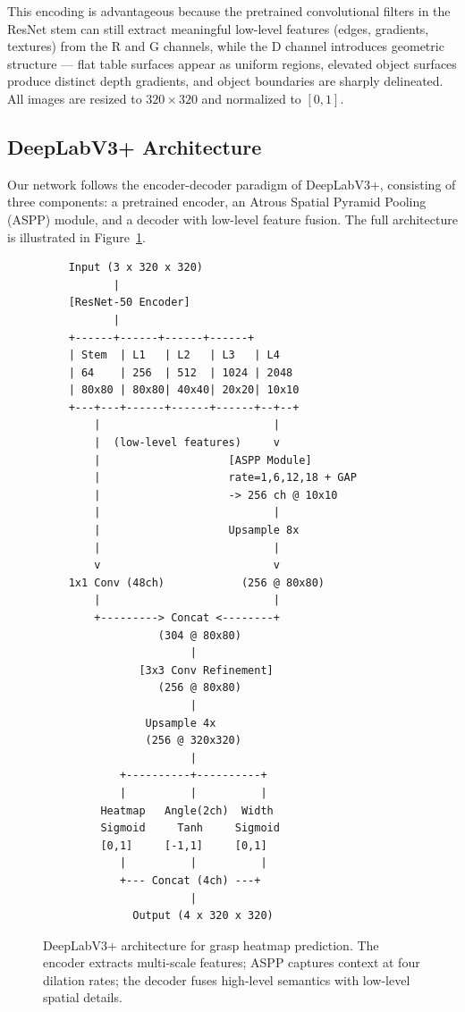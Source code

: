 \documentclass[12pt, a4paper]{article}
\begin{document}
This encoding is advantageous because the pretrained convolutional filters in the ResNet stem can still extract meaningful low-level features (edges, gradients, textures) from the R and G channels, while the D channel introduces geometric structure — flat table surfaces appear as uniform regions, elevated object surfaces produce distinct depth gradients, and object boundaries are sharply delineated. All images are resized to $320 \times 320$ and normalized to $[0, 1]$.

\subsection{DeepLabV3+ Architecture}

Our network follows the encoder-decoder paradigm of DeepLabV3+, consisting of three components: a pretrained encoder, an Atrous Spatial Pyramid Pooling (ASPP) module, and a decoder with low-level feature fusion. The full architecture is illustrated in Figure~\ref{fig:architecture}.

\begin{figure}[H]
\centering
\small
\begin{verbatim}
    Input (3 x 320 x 320)
           |
    [ResNet-50 Encoder]
           |
    +------+------+------+------+
    | Stem  | L1   | L2   | L3   | L4
    | 64    | 256  | 512  | 1024 | 2048
    | 80x80 | 80x80| 40x40| 20x20| 10x10
    +---+---+------+------+------+--+--+
        |                           |
        |  (low-level features)     v
        |                    [ASPP Module]
        |                    rate=1,6,12,18 + GAP
        |                    -> 256 ch @ 10x10
        |                           |
        |                    Upsample 8x
        |                           |
        v                           v
    1x1 Conv (48ch)            (256 @ 80x80)
        |                           |
        +---------> Concat <--------+
                  (304 @ 80x80)
                       |
               [3x3 Conv Refinement]
                  (256 @ 80x80)
                       |
                Upsample 4x
                (256 @ 320x320)
                       |
            +----------+----------+
            |          |          |
         Heatmap   Angle(2ch)  Width
         Sigmoid     Tanh     Sigmoid
         [0,1]     [-1,1]     [0,1]
            |          |          |
            +--- Concat (4ch) ---+
                       |
              Output (4 x 320 x 320)
\end{verbatim}
\caption{DeepLabV3+ architecture for grasp heatmap prediction. The encoder extracts multi-scale features; ASPP captures context at four dilation rates; the decoder fuses high-level semantics with low-level spatial details.}
\label{fig:architecture}
\end{figure}
\end{document}
